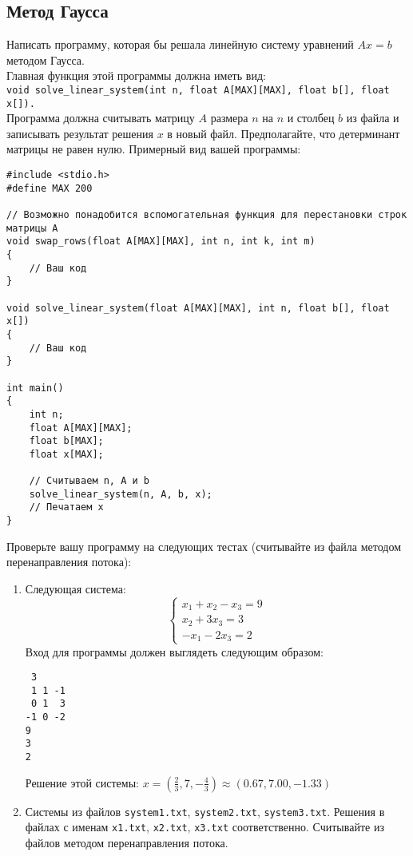 \documentclass[10pt]{article}
\begin{document}
\subsection{Метод Гаусса}
Написать программу, которая бы решала линейную систему уравнений $Ax = b$ методом Гаусса. \\
Главная функция этой программы должна иметь вид: \\ \texttt{void solve\_linear\_system(int n, float A[MAX][MAX], float b[], float x[]).} \\
Программа должна считывать матрицу $A$ размера $n$ на $n$ и столбец $b$ из файла и записывать результат решения $x$ в новый файл. Предполагайте, что детерминант матрицы не равен нулю. Примерный вид вашей программы:
\begin{lstlisting}
#include <stdio.h>
#define MAX 200

// Возможно понадобится вспомогательная функция для перестановки строк матрицы A
void swap_rows(float A[MAX][MAX], int n, int k, int m)
{
    // Ваш код
}

void solve_linear_system(float A[MAX][MAX], int n, float b[], float x[])
{
    // Ваш код
}

int main()
{
    int n;
    float A[MAX][MAX];
    float b[MAX];
    float x[MAX];
    
    // Считываем n, A и b
    solve_linear_system(n, A, b, x);
    // Печатаем x
}
\end{lstlisting}
Проверьте вашу программу на следующих тестах (считывайте из файла методом перенаправления потока): \\
\begin{enumerate}
\item Следующая система:
$$
\begin{cases} 
x_1 + x_2 - x_3 = 9 \\ 
x_2 + 3x_3 = 3 \\ 
-x_1 - 2x_3 = 2 
\end{cases}
$$
Вход для программы должен выглядеть следующим образом:
\begin{lstlisting}
 3
 1 1 -1
 0 1  3
-1 0 -2
9
3
2
\end{lstlisting}
Решение этой системы: $x = \left(\frac{2}{3}, 7, -\frac{4}{3}\right) \approx (0.67, 7.00, -1.33)$
\item Системы из файлов \texttt{system1.txt}, \texttt{system2.txt}, \texttt{system3.txt}. Решения в файлах с именам \texttt{x1.txt}, \texttt{x2.txt}, \texttt{x3.txt} соответственно. Считывайте из файлов методом перенаправления потока.
\end{enumerate}
\end{document}
